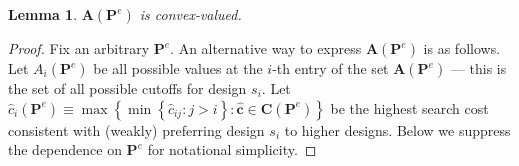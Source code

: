 \documentclass[14pt]{article}
\theoremstyle{plain}
\newtheorem{lemma}[thm]{Lemma}
\theoremstyle{definition}
\theoremstyle{remark}
\DeclareRobustCommand\1{\futurelet\oneNext\oneCheck}
\begin{document}
\begin{lemma}
$\mathbf{A}\left( \mathbf{P}^{e}\right) $ is convex-valued.
\end{lemma}

\begin{proof}
  Fix an arbitrary $\mathbf{P}^{e}$. An alternative way to express $%
\mathbf{A}\left( \mathbf{P}^{e}\right) $ is as follows. Let $A_{i}\left( 
\mathbf{P}^{e}\right) $ be all possible values at the $i$-th entry of the
set $\mathbf{A}\left( \mathbf{P}^{e}\right) $ --- this is the set of all
possible cutoffs for design $s_{i}$. Let $\hat{c}_{i}\left( \mathbf{P}%
^{e}\right) \equiv \max \left\{ \min \left\{ \hat{c}_{ij}:j>i\right\} :%
\mathbf{\hat{c}}\in \mathbf{C}\left( \mathbf{P}^{e}\right) \right\} $ be the
highest search cost consistent with (weakly) preferring design $s_{i}$ to
higher designs. Below we suppress the dependence on $\mathbf{P}^{e}$ for notational simplicity.


\end{proof}
\end{document}
